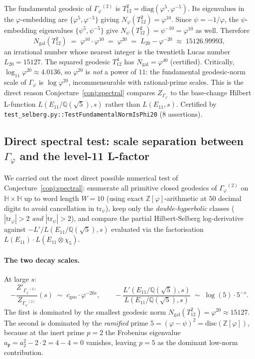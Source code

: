 \documentclass[11pt,a4paper]{article}
\theoremstyle{plain}
\theoremstyle{definition}
\theoremstyle{remark}
\numberwithin{equation}{section}
\providecommand{\Zp}{\ensuremath{\mathbb{Z}[\varphi]}}
\providecommand{\Qp}{\ensuremath{\mathbb{Q}(\sqrt{5})}}
\providecommand{\Gphi}{\ensuremath{\Gamma_{\varphi}}}
\begin{document}
The fundamental geodesic of $\Gphi^{(2)}$ is $T_{12}^{2}=\mathrm{diag}(\varphi^{5},\varphi^{-5})$.
Its eigenvalues in the $\varphi$-embedding are $\{\varphi^{5},\varphi^{-5}\}$ giving
$N_{\varphi}(T_{12}^{2})=\varphi^{10}$.  Since $\psi=-1/\varphi$, the
$\psi$-embedding eigenvalues $\{\psi^{5},\psi^{-5}\}$ give
$N_{\psi}(T_{12}^{2})=\psi^{-10}=\varphi^{10}$ as well.  Therefore
\[
  N_{\mathrm{gal}}(T_{12}^{2})\;=\;\varphi^{10}\cdot\varphi^{10}\;=\;\varphi^{20}
  \;=\;L_{20}-\varphi^{-20}\;\approx\;15126.99993,
\]
an irrational number whose nearest integer is the twentieth Lucas number
$L_{20}=15127$.  The squared geodesic $T_{12}^{4}$ has $N_{\mathrm{gal}}=\varphi^{40}$
(certified). Critically, $\log_{11}\varphi^{20}\approx 4.0136$, so $\varphi^{20}$
is \emph{not} a power of $11$: the fundamental geodesic-norm scale of $\Gphi$ is
$\log\varphi^{20}$, incommensurable with rational-prime scales.  This is the
direct reason Conjecture~\ref{conj:spectral} compares $Z_{\Gphi}$ to the
base-change Hilbert L-function $L(E_{11}/\Qp,s)$ rather than $L(E_{11},s)$.
Certified by \texttt{test\_selberg.py::TestFundamentalNormIsPhi20} (8 assertions).

\subsection*{Direct spectral test: scale separation between $\Gphi$ and the level-11 L-factor}
\label{sec:spectral-scale-test}

We carried out the most direct possible numerical test of
Conjecture~\ref{conj:spectral}: enumerate all primitive closed geodesics of
$\Gphi^{(2)}$ on $\mathbb{H}\times\mathbb{H}$ up to word length $W=10$ (using
exact $\Zp$-arithmetic at $50$ decimal digits to avoid cancellation in
$\mathrm{tr}_{\psi}$), keep only the \emph{double-hyperbolic} classes
($|\mathrm{tr}_{\varphi}|>2$ \emph{and} $|\mathrm{tr}_{\psi}|>2$), and compare the
partial Hilbert-Selberg log-derivative against $-L'/L(E_{11}/\Qp,s)$ evaluated
via the factorisation $L(E_{11})\cdot L(E_{11}\otimes\chi_{5})$.

\paragraph{The two decay scales.}  At large $s$:
\begin{equation}\label{eq:two-scales}
  -\frac{Z'_{\Gphi^{(2)}}}{Z_{\Gphi^{(2)}}}(s)\;\sim\;c_{\mathrm{geo}}\cdot\varphi^{-20s},
  \qquad
  -\frac{L'(E_{11}/\Qp,s)}{L(E_{11}/\Qp,s)}\;\sim\;\log(5)\cdot 5^{-s}.
\end{equation}
The first is dominated by the smallest geodesic norm
$N_{\mathrm{gal}}(T_{12}^{2})=\varphi^{20}\approx 15127$.  The second is
dominated by the \emph{ramified} prime $5=(\varphi-\psi)^{2}=\mathrm{disc}(\Zp)$,
because at the inert prime $p=2$ the Frobenius eigenvalue
$a_{\mathfrak{p}}=a_{2}^{2}-2\cdot 2 = 4-4=0$ vanishes, leaving $p=5$ as the
dominant low-norm contribution.
\end{document}
